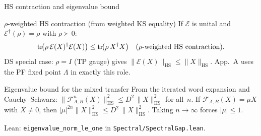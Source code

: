 \documentclass[aspectratio=169,10pt]{beamer}
\newcommand{\cE}{\mathcal{E}}
\newcommand{\cF}{\mathcal{F}}
\newcommand{\HS}{\mathrm{HS}}
\begin{document}
\begin{frame}{HS contraction and eigenvalue bound}
    \vspace{-0.6em}

    \begin{block}{$\rho$-weighted HS contraction (from weighted KS equality)}
        If $\cE$ is unital and $\cE^\dagger(\rho)=\rho$ with $\rho\succ 0$:
        \[
            \tr\!\bigl(\rho\,\cE(X)^\dagger\cE(X)\bigr) \le  \tr\!\bigl(\rho\, X^\dagger X\bigr)
            \quad (\rho\text{-weighted HS contraction}).
        \]
        \textcolor{dimwhite}{\footnotesize DS special case: $\rho=I$ (TP gauge) gives $\|\cE(X)\|_{\HS}\le\|X\|_{\HS}$.
        \cite{Cirac2017Annals} App.~A uses the PF fixed point $\Lambda$ in exactly this role.}
    \end{block}

    \begin{block}{Eigenvalue bound for the mixed transfer}
        From the iterated word expansion and Cauchy--Schwarz:
        $\|\cF_{A,B}^n(X)\|_{\HS}^2 \le D^2\,\|X\|_{\HS}^2$ for all~$n$.
        If $\cF_{A,B}(X)=\mu X$ with $X\neq 0$, then
        $|\mu|^{2n} \|X\|_{\HS}^2 \le D^2\,\|X\|_{\HS}^2$.
        Taking $n\to\infty$ forces $|\mu|\le 1$.
    \end{block}

    \textcolor{dimwhite}{\footnotesize Lean: \texttt{eigenvalue\_norm\_le\_one} in \texttt{Spectral/SpectralGap.lean}.}
\end{frame}
\end{document}
